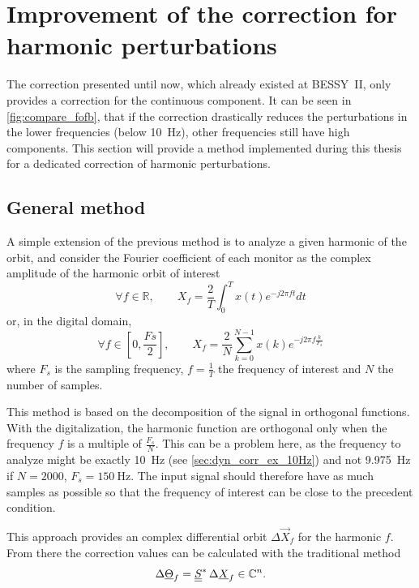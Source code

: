 \section{Improvement of the correction for harmonic perturbations}
\label{sec:dyn_corr}
The correction presented until now, which already existed at BESSY~II, only provides a correction for the continuous component. It can be seen in \cref{fig:compare_fofb}, that if the correction drastically reduces the perturbations in the lower frequencies (below \SI{10}{\hertz}), other frequencies still have high components. This section will provide a method implemented during this thesis for a dedicated correction of harmonic perturbations.

\subsection{General method}
A simple extension of the previous method is to analyze a given harmonic of the orbit, and consider the Fourier coefficient of each monitor as the complex amplitude of the harmonic orbit of interest
\begin{equation}
	\label{eq:orbit_extract}
	\forall f \in \mathbb{R}, \qquad X_f = \frac{2}{T} \int_0^T x(t) e^{-j 2 \pi f t} dt
\end{equation}
or, in the digital domain,
\begin{equation}
\forall f \in \left[0, \frac{Fs}{2}\right], \qquad X_f = \frac{2}{N} \sum\limits_{k=0}^{N-1} x(k) e^{-j 2 \pi f \frac{k}{F_s}}
\end{equation}
where $F_s$ is the sampling frequency, $f = \frac{1}{T}$ the frequency of interest and $N$ the number of samples.

This method is based on the decomposition of the signal in orthogonal functions. With the digitalization, the harmonic function are orthogonal only when the frequency $f$ is a multiple of $\frac{F_s}{N}$. This can be a problem here, as the frequency to analyze might be exactly \SI{10}{\hertz} (see \cref{sec:dyn_corr_ex_10Hz}) and not \SI{9.975}{\hertz} if $N=2000$, $F_s=\SI{150}{\hertz}$. The input signal should therefore have as much samples as possible so that the frequency of interest can be close to the precedent condition.

This approach provides an complex differential orbit $\Delta\vec{X}_f$ for the harmonic $f$. From there the correction values can be calculated with the traditional method
\begin{equation}
\Delta\underline{\Theta}_f = \underline{\underline{S}}^{*}\, \Delta\underline{X}_f   \in \mathbb{C}^n.
\end{equation}

